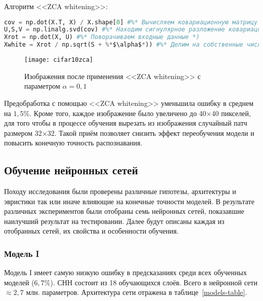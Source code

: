 Алгоритм <<ZCA whitening>>:
\begin{lstlisting}[language=Python, frame=TB]
cov = np.dot(X.T, X) / X.shape[0] #%* Вычисляем ковариационную матрицу *)
U,S,V = np.linalg.svd(cov) #%* Находим сигнулярное разложение ковариацонной матрицы *)
Xrot = np.dot(X, U) #%* Поворачиваем входные данные *)
Xwhite = Xrot / np.sqrt(S + %*$\alpha$*)) #%* Делим на собственные числа *)
\end{lstlisting}
\vspace*{-1.4cm}
\begin{figure}[h]
    \centering
    \texttt{[image: cifar10zca]}
    \caption{Изображения после применения <<ZCA whitening>> с параметром $\alpha=0,1$}
\end{figure}
Предобработка с помощью <<ZCA whitening>> уменьшила ошибку в среднем на $1,5\%$. Кроме того, каждое изображение было
увеличено до 40$\times$40 пикселей, для того чтобы в процессе обучения вырезать из 
изображения случайный патч размером 32$\times$32. Такой приём позволяет снизить эффект переобучения модели и повысить конечную 
точность распознавания.

\subsection{Обучение нейронных сетей}
Походу исследования были проверены различные гипотезы, архитектуры и эвристики так или иначе влияющие на конечные точности 
моделей. В результате различных экспериментов были отобраны семь нейронных сетей, показавшие наилучший результат на тестировании.
Далее будут описаны каждая из отобранных сетей, их свойства и особенности обучения.

\subsubsection{Модель I}
Модель I имеет самую низкую ошибку в предсказаниях среди всех обученных моделей ($6,7\%$). СНН состоит из 18 обучающихся слоёв.
Всего в нейронной сети $\approx2,7$ млн. параметров. Архитектура сети отражена в таблице~\ref{models-table}.

